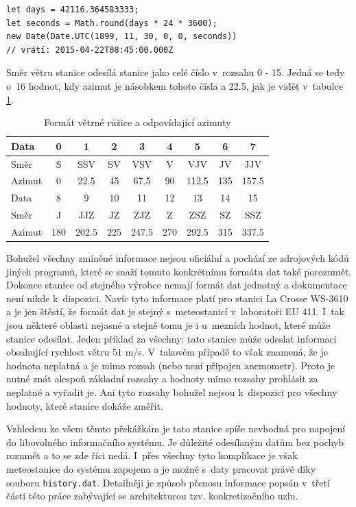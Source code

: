\begin{verbatim}
let days = 42116.364583333;
let seconds = Math.round(days * 24 * 3600);
new Date(Date.UTC(1899, 11, 30, 0, 0, seconds))
// vrátí: 2015-04-22T08:45:00.000Z
\end{verbatim}

Směr větru stanice odesílá stanice jako celé číslo v~rozsahu 0 - 15. Jedná se tedy o~16 hodnot, kdy azimut je násobkem tohoto čísla a 22.5, jak je vidět v~tabulce \ref{tab:windFormat}.

\begin{table}[h]
	\centering
	\caption{Formát větrné růžice a odpovídající azimuty}
	\label{tab:windFormat}
	\begin{tabular}{|l|c|c|c|c|c|c|c|c|}
		\hline
		Data & 0 & 1 & 2 & 3 & 4 & 5 & 6 & 7 \\
		\hline
		Směr & S & SSV & SV & VSV & V & VJV & JV & JJV \\
		\hline
		Azimut & 0 & 22.5 & 45 & 67.5 & 90 & 112.5 & 135 & 157.5 \\
		\hline \hline
		Data & 8 & 9 & 10 & 11 & 12 & 13 & 14 & 15 \\
		\hline
		Směr & J & JJZ & JZ & ZJZ & Z & ZSZ & SZ & SSZ \\
		\hline
		Azimut & 180 & 202.5 & 225 & 247.5 & 270 & 292.5 & 315 & 337.5 \\
		\hline
	\end{tabular}
\end{table}

Bohužel všechny zmíněné informace nejsou oficiální a pochází ze zdrojových kódů jiných programů, které se snaží tomuto konkrétnímu formátu dat také porozumět. Dokonce stanice od stejného výrobce nemají formát dat jednotný a dokumentace není nikde k~dispozici. Navíc tyto informace platí pro stanici La Crosse WS-3610 a je jen štěstí, že formát dat je stejný s~meteostanicí v~laboratoři EU 411. I~tak jsou některé oblasti nejasné a stejně tomu je i u~mezních hodnot, které může stanice odesílat. Jeden příklad za všechny: tato stanice může odeslat informaci obsahující rychlost větru 51 m/s. V~takovém případě to však znamená, že je hodnota neplatná a je mimo rozsah (nebo není připojen anemometr). Proto je nutné znát alespoň základní rozsahy a hodnoty mimo rozsahy prohlásit za neplatné a vyřadit je. Ani tyto rozsahy bohužel nejsou k~dispozici pro všechny hodnoty, které stanice dokáže změřit.

Vzhledem ke všem těmto překážkám je tato stanice spíše nevhodná pro napojení do libovolného informačního systému. Je důležité odesílaným datům bez pochyb rozumět a to se zde říci nedá. I~přes všechny tyto komplikace je však meteostanice do systému zapojena a je možné s~daty pracovat právě díky souboru \texttt{history.dat}. Detailněji je způsob přenosu informace popsán v~třetí části této práce zabývající se  architekturou tzv. konkretizačního uzlu.

